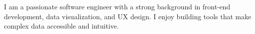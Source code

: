 
I am a passionate software engineer with a strong background in front-end development, data visualization, and UX design. 
I enjoy building tools that make complex data accessible and intuitive.
